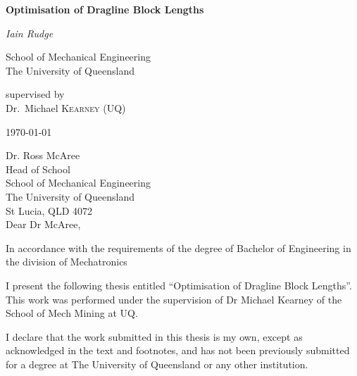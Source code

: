 \documentclass[12pt, openany, a4paper]{book}
\begin{document}
\frontmatter

\begin{titlepage}
\centering

\vspace{4cm}
{\huge\bfseries Optimisation of Dragline Block Lengths \par}
\vspace{3cm}
{\Large\itshape Iain Rudge\par}
\vspace {5mm} 
{School of Mechanical Engineering \\ The University of Queensland\par}
\vfill
supervised by\\
Dr.~Michael \textsc{Kearney} (UQ)
\vfill
{\large \today\par}
\end{titlepage}
\restoregeometry


\cleardoublepage


\begin{flushleft}
  Dr. Ross McAree\\
  Head of School\\
  School of Mechanical Engineering\\
  The University of Queensland\\
  St Lucia, QLD 4072\\
  \bigskip\bigskip
  Dear Dr McAree,
\end{flushleft}

In accordance with the requirements of the degree of Bachelor of
Engineering in the division of 
Mechatronics

I present the
following thesis entitled ``Optimisation of Dragline Block Lengths''.  This work was performed  under the supervision of
Dr Michael Kearney  of the School of Mech Mining at UQ.

I declare that the work submitted in this thesis is my own, except as
acknowledged in the text and footnotes, and has not been previously
submitted for a degree at The University of Queensland or any other
institution.
\end{document}
